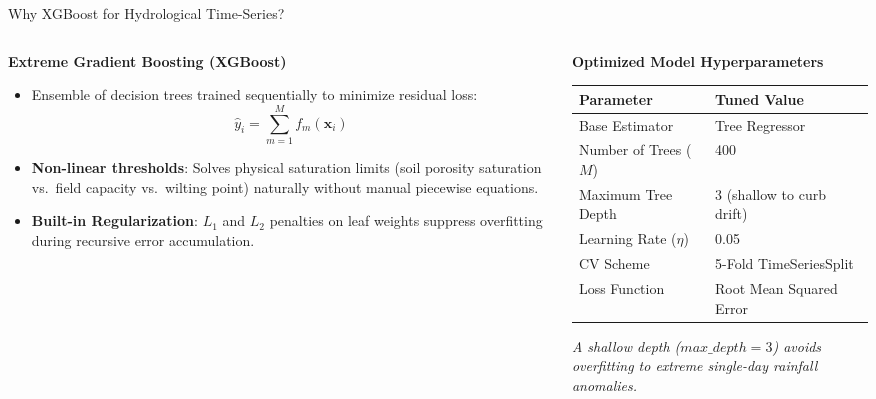 \documentclass[aspectratio=169, 10pt]{beamer}
\begin{document}
\begin{frame}{Why XGBoost for Hydrological Time-Series?}
    \begin{columns}
        \begin{column}{0.48\textwidth}
            \begin{block}{\textbf{Extreme Gradient Boosting (XGBoost)}}
                \begin{itemize}
                    \item Ensemble of decision trees trained sequentially to minimize residual loss:
                    $$\hat{y}_i = \sum_{m=1}^{M} f_m(\mathbf{x}_i)$$
                    \item \textbf{Non-linear thresholds}: Solves physical saturation limits (soil porosity saturation vs.\ field capacity vs.\ wilting point) naturally without manual piecewise equations.
                    \item \textbf{Built-in Regularization}: $L_1$ and $L_2$ penalties on leaf weights suppress overfitting during recursive error accumulation.
                \end{itemize}
            \end{block}
        \end{column}
        \begin{column}{0.48\textwidth}
            \begin{exampleblock}{\textbf{Optimized Model Hyperparameters}}
                \small
                \begin{tabular}{ll}
                    \toprule
                    \textbf{Parameter} & \textbf{Tuned Value} \\
                    \midrule
                    Base Estimator & Tree Regressor \\
                    Number of Trees ($M$) & 400 \\
                    Maximum Tree Depth & 3 (shallow to curb drift) \\
                    Learning Rate ($\eta$) & 0.05 \\
                    CV Scheme & 5-Fold TimeSeriesSplit \\
                    Loss Function & Root Mean Squared Error \\
                    \bottomrule
                \end{tabular}
                \vspace{0.15cm}
                \footnotesize
                \textit{A shallow depth ($max\_depth=3$) avoids overfitting to extreme single-day rainfall anomalies.}
            \end{exampleblock}
        \end{column}
    \end{columns}
\end{frame}
\end{document}
